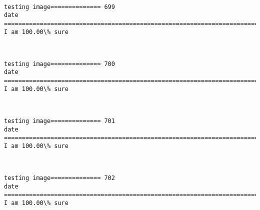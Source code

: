 \documentclass[11pt]{article}
\begin{document}
    \begin{center}
    \end{center}
    { \hspace*{\fill} \\}
    
    \begin{Verbatim}[commandchars=\\\{\}]
testing image============== 699
date
============================================================================
I am 100.00\% sure

    \end{Verbatim}

    \begin{center}
    \end{center}
    { \hspace*{\fill} \\}
    
    \begin{Verbatim}[commandchars=\\\{\}]
testing image============== 700
date
============================================================================
I am 100.00\% sure

    \end{Verbatim}

    \begin{center}
    \end{center}
    { \hspace*{\fill} \\}
    
    \begin{Verbatim}[commandchars=\\\{\}]
testing image============== 701
date
============================================================================
I am 100.00\% sure

    \end{Verbatim}

    \begin{center}
    \end{center}
    { \hspace*{\fill} \\}
    
    \begin{Verbatim}[commandchars=\\\{\}]
testing image============== 702
date
============================================================================
I am 100.00\% sure

    \end{Verbatim}
\end{document}
